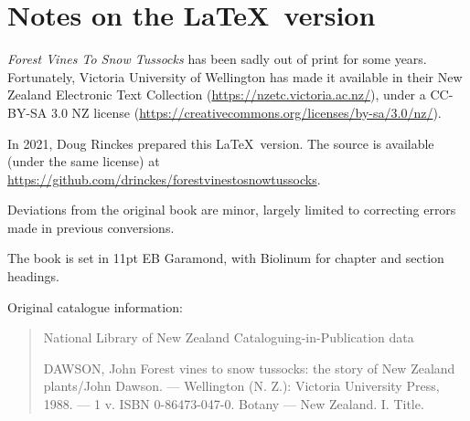 \chapter{Notes on the \LaTeX\ version}

\emph{Forest Vines To Snow Tussocks} has been sadly out of print for some years.
Fortunately, Victoria University of Wellington has made it available in their New Zealand Electronic Text Collection (\url{https://nzetc.victoria.ac.nz/}), under a CC-BY-SA 3.0 NZ license (\url{https://creativecommons.org/licenses/by-sa/3.0/nz/}).

In 2021, Doug Rinckes prepared this \LaTeX\ version.
The source is available (under the same license) at \url{https://github.com/drinckes/forestvinestosnowtussocks}.

Deviations from the original book are minor, largely limited to correcting errors made in previous conversions.

The book is set in 11pt EB Garamond, with Biolinum for chapter and section headings.

Original catalogue information:

\begin{quote}
	National Library of New Zealand\newline
	Cataloguing-in-Publication data

	DAWSON, John\newline
	Forest vines to snow tussocks: the story of New Zealand plants/John Dawson. --- Wellington (N. Z.): Victoria University Press, 1988. --- 1 v.\newline
	ISBN 0-86473-047-0. Botany --- New Zealand. I. Title.\newline
\end{quote}
